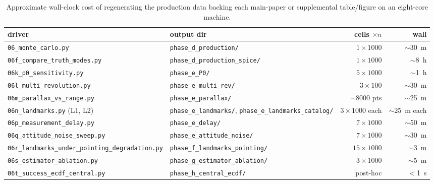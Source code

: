 \documentclass[10pt]{article}
\begin{document}
\begin{table}[h]
\centering
\caption{Approximate wall-clock cost of regenerating the production data backing each main-paper or supplemental table/figure on an eight-core machine.}
\label{tab:S-compute}
\footnotesize
\begin{tabular}{@{}llrr@{}}
\toprule
driver & output dir & cells $\times n$ & wall \\
\midrule
\texttt{06\_monte\_carlo.py}                                & \texttt{phase\_d\_production/}              & $1\!\times\!1000$  & $\sim$30~m \\
\texttt{06f\_compare\_truth\_modes.py}                       & \texttt{phase\_d\_production\_spice/}       & $1\!\times\!1000$  & $\sim$8~h \\
\texttt{06k\_p0\_sensitivity.py}                             & \texttt{phase\_e\_P0/}                       & $5\!\times\!1000$  & $\sim$1~h \\
\texttt{06l\_multi\_revolution.py}                           & \texttt{phase\_e\_multi\_rev/}               & $3\!\times\!100$   & $\sim$30~m \\
\texttt{06m\_parallax\_vs\_range.py}                         & \texttt{phase\_e\_parallax/}                 & $\sim$8000 pts     & $\sim$25~m \\
\texttt{06n\_landmarks.py} (L1, L2)                          & \texttt{phase\_e\_landmarks/}, \texttt{phase\_e\_landmarks\_catalog/} & $3\!\times\!1000$ each & $\sim$25~m each \\
\texttt{06p\_measurement\_delay.py}                          & \texttt{phase\_e\_delay/}                    & $7\!\times\!1000$  & $\sim$50~m \\
\texttt{06q\_attitude\_noise\_sweep.py}                      & \texttt{phase\_e\_attitude\_noise/}          & $7\!\times\!1000$  & $\sim$30~m \\
\texttt{06r\_landmarks\_under\_pointing\_degradation.py}     & \texttt{phase\_f\_landmarks\_pointing/}      & $15\!\times\!1000$ & $\sim$3~m \\
\texttt{06s\_estimator\_ablation.py}                         & \texttt{phase\_g\_estimator\_ablation/}      & $3\!\times\!1000$  & $\sim$5~m \\
\texttt{06t\_success\_ecdf\_central.py}                      & \texttt{phase\_h\_central\_ecdf/}            & post-hoc            & $<$1~s \\
\bottomrule
\end{tabular}
\end{table}
\end{document}

